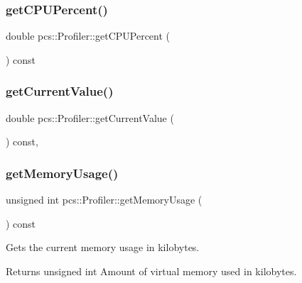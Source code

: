 \subsubsection{\texorpdfstring{get\+C\+P\+U\+Percent()}{getCPUPercent()}}
{\footnotesize\ttfamily double pcs\+::\+Profiler\+::get\+C\+P\+U\+Percent (\begin{DoxyParamCaption}{ }\end{DoxyParamCaption}) const\hspace{0.3cm}{\ttfamily [inline]}}

\mbox{\label{classpcs_1_1Profiler_a6df1a4d33cbbef99e9414f3364277dfa}} 
\subsubsection{\texorpdfstring{get\+Current\+Value()}{getCurrentValue()}}
{\footnotesize\ttfamily double pcs\+::\+Profiler\+::get\+Current\+Value (\begin{DoxyParamCaption}{ }\end{DoxyParamCaption}) const\hspace{0.3cm}{\ttfamily [inline]}, {\ttfamily [private]}}

\mbox{\label{classpcs_1_1Profiler_a9e70423b9ea7b9434258aaba14082d90}} 
\subsubsection{\texorpdfstring{get\+Memory\+Usage()}{getMemoryUsage()}}
{\footnotesize\ttfamily unsigned int pcs\+::\+Profiler\+::get\+Memory\+Usage (\begin{DoxyParamCaption}{ }\end{DoxyParamCaption}) const\hspace{0.3cm}{\ttfamily [inline]}}



Gets the current memory usage in kilobytes. 

\begin{DoxyReturn}{Returns}
unsigned int Amount of virtual memory used in kilobytes. 
\end{DoxyReturn}
\mbox{\label{classpcs_1_1Profiler_a7e1157796cb25fbcdb88ef6b3b806f3c}} 
